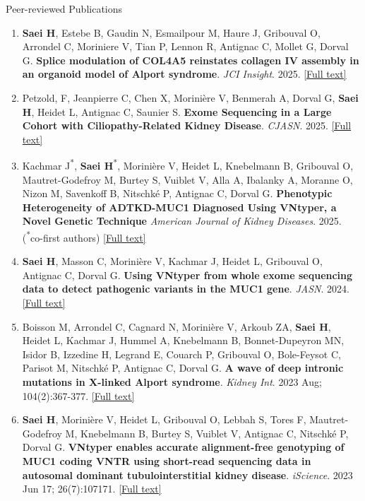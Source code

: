 \documentclass[
	11pt, %
]{resume} %
\begin{document}
\begin{rSection}{Peer-reviewed Publications}
\begin{enumerate}
  \item \textbf{Saei H},  Estebe B, Gaudin N, Esmailpour M, Haure J,  Gribouval O,  Arrondel C,  Moriniere V,  Tian P,  Lennon R,  Antignac C,  Mollet G, Dorval G. 
  \textbf{Splice modulation of COL4A5 reinstates collagen IV assembly in an organoid model of Alport syndrome}. 
  \textit{JCI Insight}. 2025. \href{https://insight.jci.org/articles/view/194759}{[Full text]}
  
    \item Petzold, F, Jeanpierre C, Chen X, Morinière V, Benmerah A, Dorval G, \textbf{Saei H}, Heidet L, Antignac C, Saunier S.
  \textbf{Exome Sequencing in a Large Cohort with Ciliopathy-Related Kidney Disease}.
  \textit{CJASN}. 2025. \href{https://journals.lww.com/cjasn/abstract/9900/exome_sequencing_in_a_large_cohort_with.802.aspx}{[Full text]}
  
    \item Kachmar J\textsuperscript{*}, \textbf{Saei H}\textsuperscript{*}, Morinière V, Heidet L, Knebelmann B, Gribouval O, Mautret-Godefroy M, Burtey S, Vuiblet V,  Alla A, Ibalanky A, Moranne O, Nizon M, Savenkoff B, Nitschké P, Antignac C, Dorval G.
   \textbf{Phenotypic Heterogeneity of ADTKD-MUC1 Diagnosed Using VNtyper, a Novel Genetic Technique}
  \textit{American Journal of Kidney Diseases}. 2025. (\textsuperscript{*}co-first authors) \href{https://www.ajkd.org/article/S0272-6386(25)00038-1/abstract}{[Full text]}
  
  \item \textbf{Saei H}, Masson C, Morinière V, Kachmar J, Heidet L, Gribouval O, Antignac C, Dorval G. 
   \textbf{Using VNtyper from whole exome sequencing data to detect pathogenic variants in the MUC1 gene}. 
  \textit{JASN}. 2024. \href{https://journals.lww.com/jasn/fulltext/2025/02000/using_vntyper_from_whole_exome_sequencing_data_to.25.aspx}{[Full text]}

  \item Boisson M, Arrondel C, Cagnard N, Morinière V, Arkoub ZA, \textbf{Saei H}, Heidet L, Kachmar J, Hummel A,
  Knebelmann B, Bonnet-Dupeyron MN, Isidor B, Izzedine H, Legrand E, Couarch P, Gribouval O, Bole-Feysot
  C, Parisot M, Nitschké P, Antignac C, Dorval G.  \textbf{A wave of deep intronic mutations in X-linked Alport syndrome}.
  \textit{Kidney Int}. 2023 Aug; 104(2):367-377. \href{https://www.kidney-international.org/article/S0085-2538(23)00376-9/fulltext}{[Full text]}

  \item \textbf{Saei H}, Morinière V, Heidet L, Gribouval O, Lebbah S, Tores F, Mautret-Godefroy M, Knebelmann B, Burtey
  S, Vuiblet V, Antignac C, Nitschké P, Dorval G.  \textbf{VNtyper enables accurate alignment-free genotyping
  of MUC1 coding VNTR using short-read sequencing data in autosomal dominant tubulointerstitial kidney
  disease}. \textit{iScience}. 2023 Jun 17; 26(7):107171. \href{https://www.cell.com/action/showPdf?pii=S2589-0042%2823%2901248-8}{[Full text]}
  

\end{enumerate}
\end{rSection}
\end{document}
